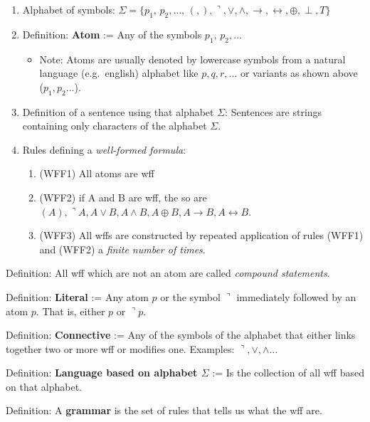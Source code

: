 \begin{enumerate}
\def\labelenumi{\arabic{enumi}.}
\tightlist
\item
  Alphabet of symbols:
  \(\Sigma=\{p_1,\,p_2,\dots ,\, (,),\urcorner ,\vee ,\wedge ,\rightarrow ,\leftrightarrow ,\oplus , \perp, T\}\)
\item
  Definition: \textbf{Atom} := Any of the symbols \(p_1,\,p_2,\dots\)

  \begin{itemize}
  \tightlist
  \item
    Note: Atoms are usually denoted by lowercase symbols from a natural
    language (e.g.~english) alphabet like \(p, q, r,\dots\) or variants
    as shown above (\(p_1,p_2\dots\)).
  \end{itemize}
\item
  Definition of a sentence using that alphabet \(\Sigma\): Sentences are
  strings containing only characters of the alphabet \(\Sigma\).
\item
  Rules defining a \emph{well-formed formula}:

  \begin{enumerate}
  \def\labelenumii{\arabic{enumii}.}
  \tightlist
  \item
    (WFF1) All atoms are wff
  \item
    (WFF2) if A and B are wff, the so are
    \((A), \urcorner A, A\vee B, A\wedge B, A\oplus B, A\rightarrow B, A\leftrightarrow B\).
  \item
    (WFF3) All wffs are constructed by repeated application of rules
    (WFF1) and (WFF2) a \emph{finite number of times}.
  \end{enumerate}
\end{enumerate}

Definition: All wff which are not an atom are called \emph{compound
statements}.

Definition: \textbf{Literal} := Any atom \(p\) or the symbol
\(\urcorner\) immediately followed by an atom \(p\). That is, either
\(p\) or \(\urcorner p\).

Definition: \textbf{Connective} := Any of the symbols of the alphabet
that either links together two or more wff or modifies one. Examples:
\(\urcorner ,\vee ,\wedge\dots\)

Definition: \textbf{Language based on alphabet \(\Sigma\)} := Is the
collection of all wff based on that alphabet.

Definition: A \textbf{grammar} is the set of rules that tells us what
the wff are.

